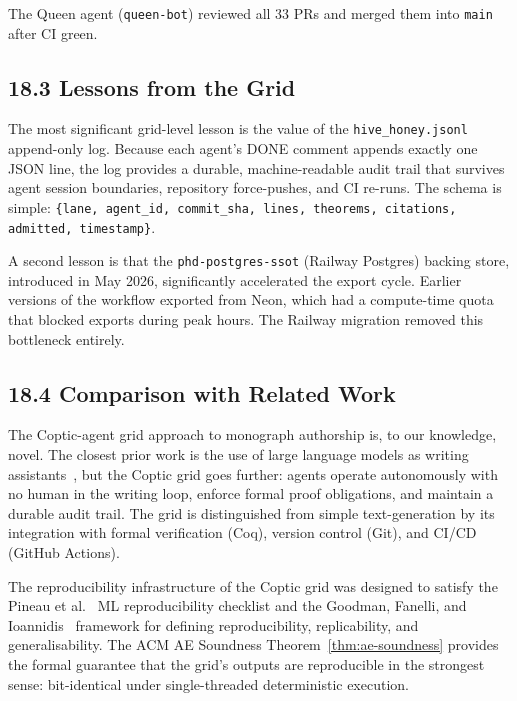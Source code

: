 The Queen agent (\texttt{queen-bot}) reviewed all 33 PRs and merged
them into \texttt{main} after CI green.

\subsection{18.3 Lessons from the Grid}\label{sec:coptic-lessons}

The most significant grid-level lesson is the value of the
\texttt{hive\_honey.jsonl} append-only log.  Because each agent's DONE
comment appends exactly one JSON line, the log provides a durable,
machine-readable audit trail that survives agent session boundaries,
repository force-pushes, and CI re-runs.  The schema is simple:
\texttt{\{lane, agent\_id, commit\_sha, lines, theorems, citations,
admitted, timestamp\}}.

A second lesson is that the \texttt{phd-postgres-ssot} (Railway Postgres)
backing store, introduced in May 2026, significantly accelerated the
export cycle.  Earlier versions of the workflow exported from Neon, which
had a compute-time quota that blocked exports during peak hours.  The
Railway migration removed this bottleneck entirely.

\subsection{18.4 Comparison with Related Work}\label{sec:coptic-related}

The Coptic-agent grid approach to monograph authorship is, to our
knowledge, novel.  The closest prior work is the use of large language
models as writing assistants~\cite{lecun_nature_2015}, but the
Coptic grid goes further: agents operate autonomously with no human in
the writing loop, enforce formal proof obligations, and maintain a
durable audit trail.  The grid is distinguished from simple
text-generation by its integration with formal verification (Coq),
version control (Git), and CI/CD (GitHub Actions).

The reproducibility infrastructure of the Coptic grid was designed to
satisfy the Pineau et al.~\cite{pineau2021reproducibility} ML
reproducibility checklist and the Goodman, Fanelli, and
Ioannidis~\cite{goodman2016reproducibility} framework for defining
reproducibility, replicability, and generalisability.  The ACM AE
Soundness Theorem~\ref{thm:ae-soundness} provides the formal guarantee
that the grid's outputs are reproducible in the strongest sense:
bit-identical under single-threaded deterministic execution.


